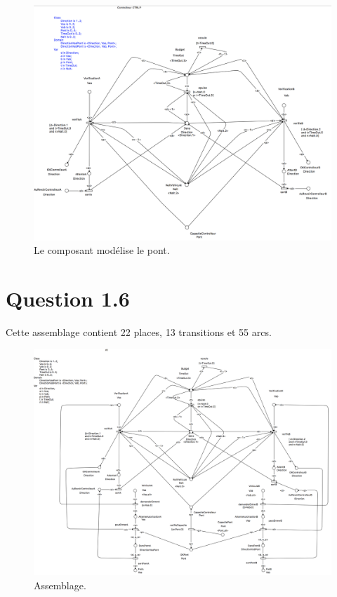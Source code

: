 \documentclass[a4paper,11pt]{report}
\begin{document}
	\begin{figure}[!htbp]
		\includegraphics[width = 18cm]{ctrlpModel.png}
		\caption{Le composant modélise le pont.}
	\end{figure}
	\newpage
	
\section{Question 1.6}
	Cette assemblage contient 22 places, 13 transitions et 55$  $ arcs.
	
	\begin{figure}[!htbp]
		\includegraphics[width = 18cm]{allModel.png}
		\caption{Assemblage.}
	\end{figure}
	\newpage
	
\end{document}
